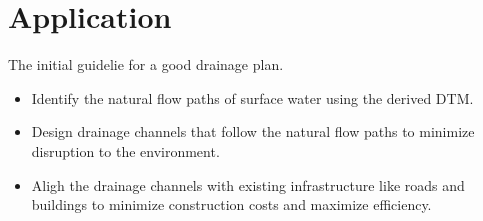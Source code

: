 \section{Application}
The initial guidelie for a good drainage plan.
\begin{itemize}
    \item Identify the natural flow paths of surface water using the derived DTM.
    \item Design drainage channels that follow the natural flow paths to minimize disruption to the environment.
    \item Aligh the drainage channels with existing infrastructure like roads and buildings to minimize construction costs and maximize efficiency.
\end{itemize}

